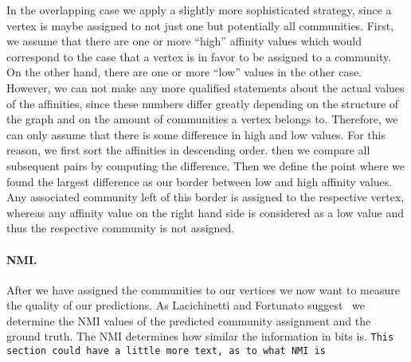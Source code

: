 In the overlapping case we apply a slightly more sophisticated strategy, since a vertex is maybe assigned to not just one but potentially all communities. First, we assume that there are one or more ``high'' affinity values which would correspond to the 
case that a vertex is in favor to be assigned to a community. On the other hand, there are one or more ``low'' values in the other case. However, we can not make any more qualified statements about the actual values of the affinities, since these numbers differ greatly depending on the structure of the graph and on the amount of communities a vertex belongs to. Therefore, we can only assume that there is some difference in high and low values. For this reason, we first sort the affinities in descending order. then we compare all subsequent pairs by computing the difference. Then we define the point where we found the largest difference as our border between low and high affinity values. Any associated community left of this border is assigned to the respective vertex, whereas any affinity value on the right hand side is considered as a low value and thus the respective community is not assigned.

\paragraph{NMI.}
After we have assigned the communities to our vertices we now want to measure 
the quality of our predictions. As Lacichinetti and Fortunato 
suggest~\cite{LF09} we determine the NMI values of the predicted community 
assignment and the ground truth. The NMI determines how similar the 
information in bits is. \texttt{This section could have a little more text, as to what NMI is}
